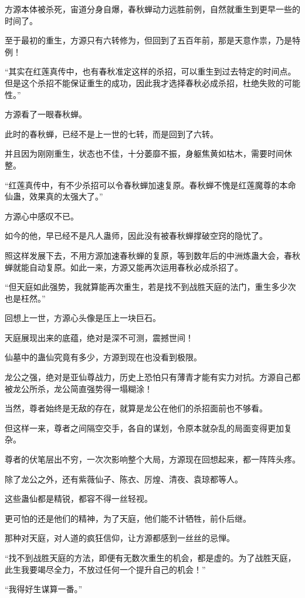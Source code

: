 \begin{this_body}
方源本体被杀死，宙道分身自爆，春秋蝉动力远胜前例，自然就重生到更早一些的时间了。

至于最初的重生，方源只有六转修为，但回到了五百年前，那是天意作祟，乃是特例！

“其实在红莲真传中，也有春秋准定这样的杀招，可以重生到过去特定的时间点。但是这个杀招不能保证重生的成功，因此我才选择春秋必成杀招，杜绝失败的可能性。”

方源看了一眼春秋蝉。

此时的春秋蝉，已经不是上一世的七转，而是回到了六转。

并且因为刚刚重生，状态也不佳，十分萎靡不振，身躯焦黄如枯木，需要时间休整。

“红莲真传中，有不少杀招可以令春秋蝉加速复原。春秋蝉不愧是红莲魔尊的本命仙蛊，效果真的太强大了。”

方源心中感叹不已。

如今的他，早已经不是凡人蛊师，因此没有被春秋蝉撑破空窍的隐忧了。

照这样发展下去，不用方源加速春秋蝉的复原，等到数年后的中洲炼蛊大会，春秋蝉就能自动复原。如此一来，方源又能再次运用春秋必成杀招了。

“但天庭如此强势，我就算能再次重生，若是找不到战胜天庭的法门，重生多少次也是枉然。”

回想上一世，方源心头像是压上一块巨石。

天庭展现出来的底蕴，绝对是深不可测，震撼世间！

仙墓中的蛊仙究竟有多少，方源到现在也没看到极限。

龙公之强，绝对是亚仙尊战力，历史上恐怕只有薄青才能有实力对抗。方源自己都被龙公所杀，龙公简直强势得一塌糊涂！

当然，尊者始终是无敌的存在，就算是龙公在他们的杀招面前也不够看。

但这样一来，尊者之间隔空交手，各自的谋划，令原本就杂乱的局面变得更加复杂。

尊者的伏笔层出不穷，一次次影响整个大局，方源现在回想起来，都一阵阵头疼。

除了龙公之外，还有紫薇仙子、陈衣、厉煌、清夜、袁琼都等人。

这些蛊仙都是精锐，都容不得一丝轻视。

更可怕的还是他们的精神，为了天庭，他们能不计牺牲，前仆后继。

那种对天庭，对人道的疯狂信仰，让方源都感到一丝丝的忌惮。

“找不到战胜天庭的方法，即便有无数次重生的机会，都是虚的。为了战胜天庭，此生我要竭尽全力，不放过任何一个提升自己的机会！”

“我得好生谋算一番。”


\end{this_body}
